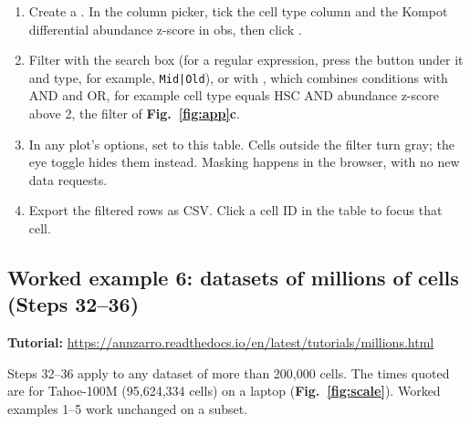 \begin{enumerate}
\def\labelenumi{\arabic{enumi}.}
\setcounter{enumi}{27}
\tightlist
\item
  Create a . In the column picker, tick the cell type column and the Kompot differential abundance z-score in obs, then click .
\item
  Filter with the search box (for a regular expression, press the  button under it and type, for example, \texttt{Mid|Old}), or with , which combines conditions with AND and OR, for example cell type equals HSC AND abundance z-score above 2, the filter of \textbf{Fig.~\ref{fig:app}c}.
\item
  In any plot's options, set  to this table. Cells outside the filter turn gray; the eye toggle hides them instead. Masking happens in the browser, with no new data requests.
\item
  Export the filtered rows as CSV. Click a cell ID in the table to focus that cell.
\end{enumerate}

\subsection{Worked example 6: datasets of millions of cells (Steps 32--36)}

\noindent\textbf{Tutorial:} \url{https://annzarro.readthedocs.io/en/latest/tutorials/millions.html}


Steps 32--36 apply to any dataset of more than 200,000 cells. The times quoted are for Tahoe-100M (95,624,334 cells\cite{zhang2025tahoe}) on a laptop (\textbf{Fig.~\ref{fig:scale}}). Worked examples 1--5 work unchanged on a subset.

